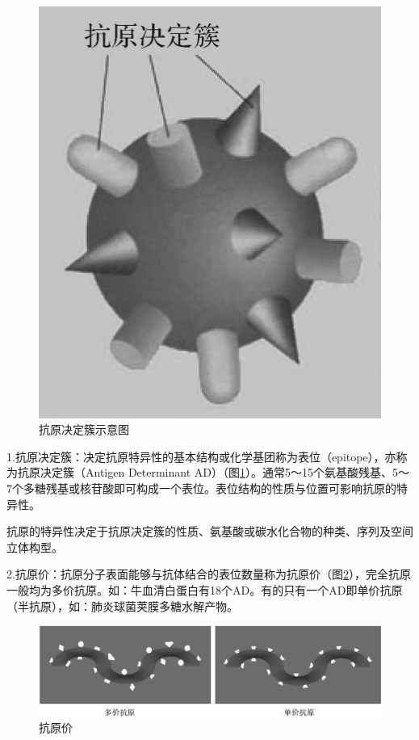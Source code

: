 \begin{figure}[!htbp]
 \centering
 \includegraphics{./images/Image00050.jpg}
 \captionsetup{justification=centering}
 \caption{抗原决定簇示意图}
 \label{fig3-1}
  \end{figure}

1.抗原决定簇：决定抗原特异性的基本结构或化学基团称为表位（epitope），亦称为抗原决定簇（Antigen
Determinant
AD）（图\ref{fig3-1}）。通常5～15个氨基酸残基、5～7个多糖残基或核苷酸即可构成一个表位。表位结构的性质与位置可影响抗原的特异性。

抗原的特异性决定于抗原决定簇的性质、氨基酸或碳水化合物的种类、序列及空间立体构型。

2.抗原价：抗原分子表面能够与抗体结合的表位数量称为抗原价（图\ref{fig3-2}），完全抗原一般均为多价抗原。如：牛血清白蛋白有18个AD。有的只有一个AD即单价抗原（半抗原），如：肺炎球菌荚膜多糖水解产物。

\begin{figure}[!htbp]
 \centering
 \includegraphics[width=.6\textwidth]{./images/Image00051.jpg}
 \captionsetup{justification=centering}
 \caption{抗原价}
 \label{fig3-2}
  \end{figure}

